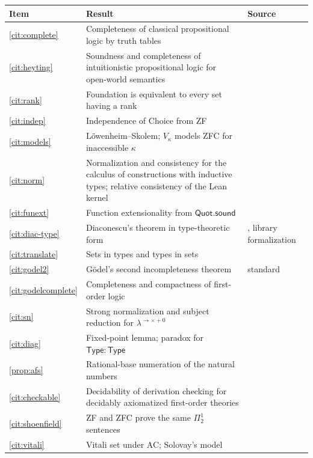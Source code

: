 \documentclass[11pt]{article}
\newcommand{\Type}{\mathsf{Type}}
\newcommand{\Quot}{\mathsf{Quot}}
\theoremstyle{definition}
\theoremstyle{plain}
\theoremstyle{remark}
\begin{document}
\begin{center}
\small
\begin{tabular}{@{}p{}p{}p{}@{}}
\toprule
Item & Result & Source\\
\midrule
\ref{cit:complete} & Completeness of classical propositional logic by truth tables & \cite{TvD88}\\
\ref{cit:heyting} & Soundness and completeness of intuitionistic propositional logic for open-world semantics & \cite{TvD88}\\
\ref{cit:rank} & Foundation is equivalent to every set having a rank & \cite{Jech03}\\
\ref{cit:indep} & Independence of Choice from ZF & \cite{Goedel38,Cohen63}\\
\ref{cit:models} & L\"owenheim--Skolem; $V_\kappa$ models ZFC for inaccessible $\kappa$ & \cite{Jech03,Kunen80}\\
\ref{cit:norm} & Normalization and consistency for the calculus of constructions with inductive types; relative consistency of the Lean kernel & \cite{CoquandHuet88,CoquandPaulin90,Werner94,Carneiro19}\\
\ref{cit:funext} & Function extensionality from $\Quot.\mathsf{sound}$ & \cite{Carneiro19}\\
\ref{cit:diac-type} & Diaconescu's theorem in type-theoretic form & \cite{Diaconescu75}, library formalization\\
\ref{cit:translate} & Sets in types and types in sets & \cite{Aczel78,Aczel99,Werner97,Carneiro19}\\
\ref{cit:godel2} & G\"odel's second incompleteness theorem & standard\\
\ref{cit:godelcomplete} & Completeness and compactness of first-order logic & \cite{Goedel30,Enderton01}\\
\ref{cit:sn} & Strong normalization and subject reduction for $\lambda^{\to\times+0}$ & \cite{Tait67,GLT89}\\
\ref{cit:diag} & Fixed-point lemma; paradox for $\Type:\Type$ & \cite{BBJ07,Hurkens95}\\
\ref{prop:afs} & Rational-base numeration of the natural numbers & \cite{AFS08}\\
\ref{cit:checkable} & Decidability of derivation checking for decidably axiomatized first-order theories & \cite{Enderton01}\\
\ref{cit:shoenfield} & ZF and ZFC prove the same $\Pi^1_2$ sentences & \cite{Jech03}\\
\ref{cit:vitali} & Vitali set under AC; Solovay's model & \cite{Solovay70}\\
\bottomrule
\end{tabular}
\end{center}
\end{document}
